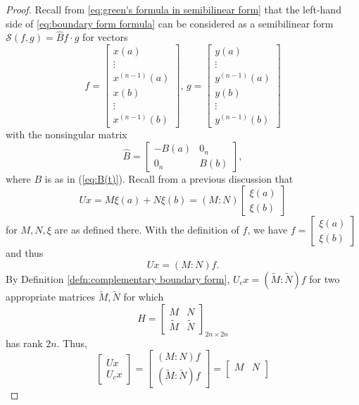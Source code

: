 \documentclass[11pt, oneside, a4paper]{article}
\begin{document}
\begin{proof}
    Recall from \eqref{eq:green's formula in semibilinear form} that the left-hand side of \eqref{eq:boundary form formula} can be considered as a semibilinear form $\mathcal{S}(f,g)=\hat{B}f\cdot g$ for vectors
    \[
        f=
        \begin{bmatrix}
            x(a)\\
            \vdots\\
            x^{(n-1)}(a)\\
            x(b)\\
            \vdots\\
            x^{(n-1)}(b)
        \end{bmatrix},\,
        g=
        \begin{bmatrix}
            y(a)\\
            \vdots\\
            y^{(n-1)}(a)\\
            y(b)\\
            \vdots\\
            y^{(n-1)}(b)
        \end{bmatrix}
    \]
    with the nonsingular matrix
    \[
        \hat{B}=
        \begin{bmatrix}
            -B(a) & 0_n\\
            0_n & B(b)
        \end{bmatrix},
    \]
    where $B$ is as in (\ref{eq:B(t)}).
    Recall from a previous discussion that 
    \[Ux = M\xi(a) + N\xi(b) = (M:N)\begin{bmatrix}\xi(a)\\ \xi(b)\end{bmatrix}\]
    for $M, N, \xi$ are as defined there. With the definition of $f$, we have $f=\begin{bmatrix}\xi(a)\\ \xi(b)\end{bmatrix}$ and thus
    \[Ux = (M:N)f.\]
    By Definition \ref{defn:complementary boundary form}, $U_c x = (\tilde{M}:\tilde{N})f$ for two appropriate matrices $\tilde{M}, \tilde{N}$ for which
    \[H = \begin{bmatrix}M & N\\
    \tilde{M} & \tilde{N}\end{bmatrix}_{2n\times 2n}\]
    has rank $2n$. Thus,
    \[\begin{bmatrix}Ux\\ U_cx\end{bmatrix} = \begin{bmatrix}(M:N)f\\(\tilde{M}:\tilde{N})f\end{bmatrix} = \begin{bmatrix}M & N\\

\end{bmatrix}\]
\end{proof}
\end{document}
